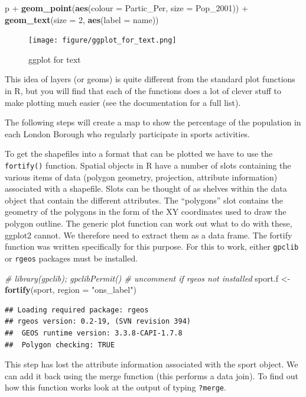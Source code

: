 \documentclass[]{article}
\newenvironment{Shaded}{}{}
\newcommand{\KeywordTok}[1]{\textcolor[rgb]{0.00,0.44,0.13}{\textbf{{#1}}}}
\newcommand{\DataTypeTok}[1]{\textcolor[rgb]{0.56,0.13,0.00}{{#1}}}
\newcommand{\DecValTok}[1]{\textcolor[rgb]{0.25,0.63,0.44}{{#1}}}
\newcommand{\StringTok}[1]{\textcolor[rgb]{0.25,0.44,0.63}{{#1}}}
\newcommand{\CommentTok}[1]{\textcolor[rgb]{0.38,0.63,0.69}{\textit{{#1}}}}
\newcommand{\NormalTok}[1]{{#1}}
\begin{document}
\begin{Shaded}
\begin{Highlighting}[]
\NormalTok{p + }\KeywordTok{geom_point}\NormalTok{(}\KeywordTok{aes}\NormalTok{(}\DataTypeTok{colour =} \NormalTok{Partic_Per, }\DataTypeTok{size =} \NormalTok{Pop_2001)) + }\KeywordTok{geom_text}\NormalTok{(}\DataTypeTok{size =} \DecValTok{2}\NormalTok{, }
    \KeywordTok{aes}\NormalTok{(}\DataTypeTok{label =} \NormalTok{name))}
\end{Highlighting}
\end{Shaded}
\begin{figure}[htbp]
\centering
\texttt{[image: figure/ggplot\_for\_text.png]}
\caption{ggplot for text}
\end{figure}

This idea of layers (or geoms) is quite different from the standard plot
functions in R, but you will find that each of the functions does a lot
of clever stuff to make plotting much easier (see the documentation for
a full list).

The following steps will create a map to show the percentage of the
population in each London Borough who regularly participate in sports
activities.

To get the shapefiles into a format that can be plotted we have to use
the \texttt{fortify()} function. Spatial objects in R have a number of
slots containing the various items of data (polygon geometry,
projection, attribute information) associated with a shapefile. Slots
can be thought of as shelves within the data object that contain the
different attributes. The ``polygons'' slot contains the geometry of the
polygons in the form of the XY coordinates used to draw the polygon
outline. The generic plot function can work out what to do with these,
ggplot2 cannot. We therefore need to extract them as a data frame. The
fortify function was written specifically for this purpose. For this to
work, either \texttt{gpclib} or \texttt{rgeos} packages must be
installed.

\begin{Shaded}
\begin{Highlighting}[]
\CommentTok{# library(gpclib); gpclibPermit() # uncomment if rgeos not installed}
\NormalTok{sport.f <- }\KeywordTok{fortify}\NormalTok{(sport, }\DataTypeTok{region =} \StringTok{"ons_label"}\NormalTok{)}
\end{Highlighting}
\end{Shaded}
\begin{verbatim}
## Loading required package: rgeos
## rgeos version: 0.2-19, (SVN revision 394)
##  GEOS runtime version: 3.3.8-CAPI-1.7.8 
##  Polygon checking: TRUE
\end{verbatim}
This step has lost the attribute information associated with the sport
object. We can add it back using the merge function (this performs a
data join). To find out how this function works look at the output of
typing \texttt{?merge}.
\end{document}
